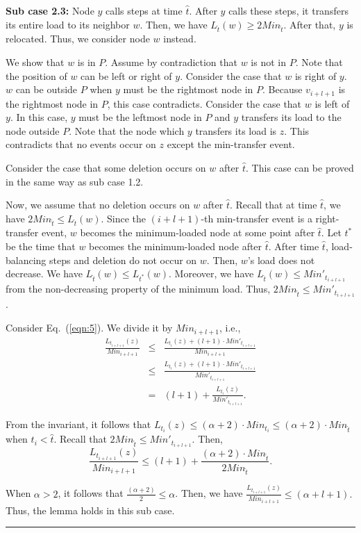 \documentclass[a4paper]{article}
\newenvironment{proof}{{\bf Proof:}}{\hfill\rule{1.5mm}{3mm}\vspace{0.1in}}
\begin{document}
\begin{proof}
 \textbf{Sub case 2.3:} Node $y$ calls {\splitmax} steps at time
 $\hat{t}$. After $y$ calls these steps, it transfers its entire load
 to its neighbor $w$. Then, we have $L_{\hat{t}}(w)\geq 2 Min_{\hat{t}}$. After
 that, $y$ is relocated. Thus, we consider node $w$ instead. 
 
 We show that $w$ is in $P$. Assume by contradiction that $w$ is not in $P$.
 Note that the position of $w$ can be left or right of $y$.
 Consider the case that $w$ is right of $y$. $w$ can be outside $P$ when 
 $y$ must be the rightmost node in $P$. Because $v_{i+l+1}$ is the rightmost node 
 in $P$, this case contradicts. Consider the case that $w$ is left of $y$. 
 In this case, $y$ must be the leftmost node in $P$ and $y$ transfers its load to the node
 outside $P$. Note that the node which $y$ transfers its load is $z$.
 This contradicts that no events occur on $z$ except the min-transfer event.
  
 Consider the case that some
 deletion occurs on $w$ after $\hat{t}$. This case can be proved in the same
 way as sub case 1.2.

 Now, we assume  that no deletion occurs on $w$ after
 $\hat{t}$.  Recall that at time $\hat{t}$, we have $2
 Min_{\hat{t}}\leq L_{\hat{t}}(w)$.  Since the $(i+l+1)$-th
 min-transfer event is a right-transfer event, $w$ becomes the
 minimum-loaded node at some point after $\hat{t}$. Let $t^*$ be the time that $w$
 becomes the minimum-loaded node after $\hat{t}$.  After time
 $\hat{t}$, load-balancing steps and deletion do not occur on $w$.  Then,
  $w$'s load does not decrease.  We have
 $L_{\hat{t}}(w)\leq L_{t^*}(w)$.  Moreover, we have
 $L_{\hat{t}}(w)\leq Min'_{t_{i+l+1}}$ from the non-decreasing property
 of the minimum load.  Thus, $2 Min_{\hat{t}}\leq Min'_{t_{i+l+1}}$.

 Consider Eq.~(\ref{eqn:5}). We divide it by $Min_{i+l+1}$,
 i.e.,\begin{eqnarray*}\label{z-and-m-general}
   \frac{L_{t_{i+l+1}}(z)}{Min_{i+l+1}} &\leq& \frac{L_{t_i}(z)+
     (l+1)\cdot Min'_{t_{i+l+1}}}{Min_{i+l+1}}\\
   &\leq& \frac{L_{t_i}(z)+ (l+1)\cdot
     Min'_{t_{i+l+1}}}{Min'_{t_{i+l+1}}}\\
   & = & (l+1)+\frac{L_{t_i}(z)}{Min'_{t_{i+l+1}}}.
 \end{eqnarray*}  

 From the invariant, it follows that $L_{t_i}(z)\leq (\alpha+2)\cdot
 Min_{t_i}\leq (\alpha+2)\cdot Min_{\hat{t}}$ when
 $t_i<\hat{t}$. Recall that $2 Min_{\hat{t}}\leq Min'_{t_{i+l+1}}$.
 Then,
\[
\frac{L_{t_{i+l+1}}(z)}{Min_{i+l+1}} \leq (l+1)+\frac{(\alpha+2)\cdot
  Min_{\hat{t}}}{2Min_{\hat{t}}}.
\]

When $\alpha>2$, it follows that $\frac{(\alpha+2)}{2}\leq\alpha$. Then, we
have $ \frac{L_{t_{i+l+1}}(z)}{Min_{i+l+1}}\leq (\alpha+l+1).  $ Thus,
the lemma holds in this sub case.
\end{proof}
\end{document}
